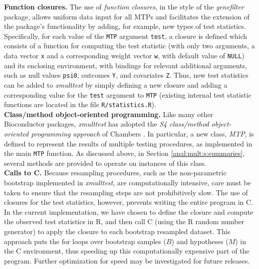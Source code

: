 \documentclass[11pt]{article}
\newcommand{\Rpackage}[1]{\textit{#1}}
\newcommand{\Robject}[1]{\texttt{#1}}
\newcommand{\Rclass}[1]{\textit{#1}}
\begin{document}
\noindent
{\bf Function closures.}  The use of {\em function closures}, in the style of the \Rpackage{genefilter} package, allows uniform data input for all MTPs and facilitates the extension of the package's functionality by adding, for example, new types of test statistics. 
Specifically, for each value of the \Robject{MTP} argument \Robject{test}, a closure is defined which consists of a function for computing the test statistic (with only two arguments, a data vector \Robject{x} and a corresponding weight vector \Robject{w}, with default value of \Robject{NULL}) and its enclosing environment, with bindings for relevant additional arguments, such as null values \Robject{psi0}, outcomes \Robject{Y}, and covariates \Robject{Z}. 
Thus, new test statistics can be added to \Rpackage{xmulttest} by simply defining a new closure and adding a corresponding value for the \Robject{test} argument to \Robject{MTP} (existing internal test statistic functions are located in the file \texttt{R/statistics.R}).\\

\noindent
{\bf Class/method object-oriented programming.}  Like many other Bioconductor packages, \Rpackage{xmulttest}  has adopted the {\em S4 class/method object-oriented programming approach} of Chambers \cite{Chambers98}.
In particular, a new class, \Rclass{MTP}, is defined to represent the results of multiple testing procedures, as implemented in the main \Robject{MTP} function. As discussed above, in Section \ref{anal:mult:s:summaries}, several methods are provided to operate on instances of this class.\\

\noindent
{\bf Calls to C.} Because resampling procedures, such as the non-parametric bootstrap implemented in \Rpackage{xmulttest}, are computationally intensive, care must be taken to ensure that the resampling steps are not prohibitively slow. The use of closures for the test statistics, however, prevents writing the entire program in C. In the current implementation, we have chosen to define the closure and compute the observed test statistics in R, and then call C (using the R random number generator) to apply the closure to each bootstrap resampled dataset. This approach puts the for loops over bootstrap samples ($B$) and hypotheses ($M$) in the C environment, thus speeding up this computationally expensive part of the program. Further optimization for speed may be investigated for future releases. 

\end{document}
